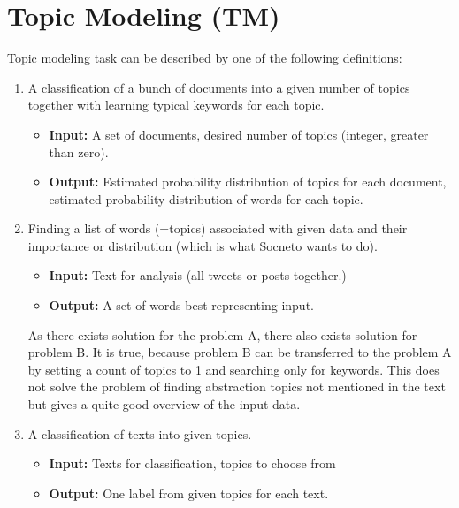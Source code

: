 \section{Topic Modeling (TM)}
\label{sec:topic_modelling}
Topic modeling task can be described by one of the following definitions:
\par
\begin{enumerate}

  \item A classification of a bunch of documents into a given number of topics together with learning typical keywords for each topic.
  \begin{itemize}
      \item \textbf{Input:} A set of documents, desired number of topics (integer, greater than zero).
      \item \textbf{Output:} Estimated probability distribution of topics for each document, estimated probability distribution of words for each topic.
    \end{itemize}
  \item Finding a list of words (=topics) associated with given data and their importance or distribution (which is what Socneto wants to do). 
  \begin{itemize}
      \item \textbf{Input:} Text for analysis (all tweets or posts together.)
      \item \textbf{Output:} A set of words best representing input.
    \end{itemize}

As there exists solution for the problem A, there also exists solution for problem B. It is true, because problem B can be transferred to the problem A by setting a count of topics to 1 and searching only for keywords. This does not solve the problem of finding abstraction topics not mentioned in the text but gives a quite good overview of the input data.
  \item A classification of texts into given topics.
   \begin{itemize}
      \item \textbf{Input:} Texts for classification, topics to choose from
      \item \textbf{Output:} One label from given topics for each text.
    \end{itemize}

\end{enumerate}
